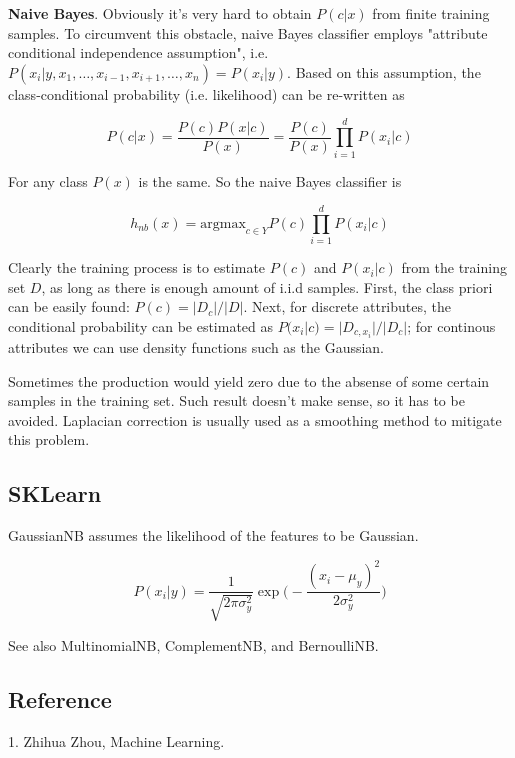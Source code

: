 {\bf Naive Bayes}. Obviously it's very hard to obtain $P(c|x)$ from finite
training samples. To circumvent this obstacle, naive Bayes classifier employs
"attribute conditional independence assumption", i.e.
$P(x_i|y,x_1,\ldots,x_{i-1},x_{i+1},\ldots,x_n)=P(x_i|y)$. Based on this
assumption, the class-conditional probability (i.e. likelihood) can be
re-written as

$$ P(c|x) = \frac{P(c)P(x|c)}{P(x)} = \frac{P(c)}{P(x)} \prod_{i=1}^d P(x_i|c)$$

For any class $P(x)$ is the same. So the naive Bayes classifier is

$$ h_{nb}(x) = \text{argmax}_{c\in Y} P(c)\prod_{i=1}^d P(x_i|c) $$

Clearly the training process is to estimate $P(c)$ and $P(x_i|c)$ from
the training set $D$, as long as there is enough amount of i.i.d samples. 
First, the class priori can be easily found: $P(c) = |D_c|/|D|$.
Next, for discrete attributes, the conditional probability can be estimated
as $P(x_i|c) = |D_{c,x_i}|/|D_c|$; for continous attributes we can use density
functions such as the Gaussian.

Sometimes the production would yield zero due to the absense of some certain samples
in the training set. Such result doesn't make sense, so it has to be avoided.
Laplacian correction is usually used as a smoothing method to mitigate this problem.

\subsection{SKLearn}

GaussianNB assumes the likelihood of the features to be Gaussian.

$$ P(x_i|y) = \frac{1}{\sqrt{2\pi\sigma_y^2}} \exp\Big(-\frac{(x_i-\mu_y)^2}{2\sigma_y^2}\Big) $$

See also MultinomialNB, ComplementNB, and BernoulliNB.

\subsection{Reference}

1. Zhihua Zhou, Machine Learning.
